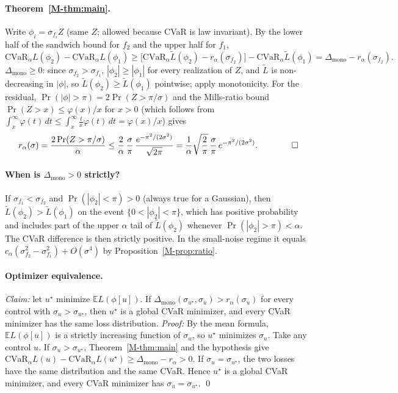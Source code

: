\documentclass[aps,pra,onecolumn,notitlepage,superscriptaddress,nofootinbib,floatfix]{revtex4-2}
\newcommand{\cvar}{\mathrm{CVaR}}
\newcommand{\E}{\mathbb{E}}
\newcommand{\Lt}{\widetilde L}
\begin{document}
\paragraph*{Theorem~\ref{M-thm:main}.} Write $\phi_i=\sigma_{f_i}Z$ (same $Z$;
allowed because CVaR is law invariant). By the lower half of
the sandwich bound for $f_2$ and the upper half for $f_1$,
\[
\cvar_\alpha L(\phi_2)-\cvar_\alpha L(\phi_1)\ge
\big[\cvar_\alpha\Lt(\phi_2)-r_\alpha(\sigma_{f_2})\big]-\cvar_\alpha\Lt(\phi_1)
=\Delta_{\mathrm{mono}}-r_\alpha(\sigma_{f_2}).
\]
$\Delta_{\mathrm{mono}}\ge0$: since $\sigma_{f_2}>\sigma_{f_1}$,
$|\phi_2|\ge|\phi_1|$ for every realization of $Z$, and $\Lt$ is
non-decreasing in $|\phi|$, so $\Lt(\phi_2)\ge\Lt(\phi_1)$ pointwise; apply
monotonicity. For the residual, $\Pr(|\phi|>\pi)=2\Pr(Z>\pi/\sigma)$ and the
Mills-ratio bound $\Pr(Z>x)\le\varphi(x)/x$ for $x>0$ (which follows from
$\int_x^\infty\varphi(t)\,dt\le\int_x^\infty\tfrac tx\varphi(t)\,dt=\varphi(x)/x$)
gives
\[
r_\alpha(\sigma)=\frac{2\Pr(Z>\pi/\sigma)}{\alpha}\le\frac{2}{\alpha}\,\frac{\sigma}{\pi}\,\frac{e^{-\pi^2/(2\sigma^2)}}{\sqrt{2\pi}}
=\frac1\alpha\sqrt{\frac2\pi}\,\frac\sigma\pi\,e^{-\pi^2/(2\sigma^2)} .\qquad\qed
\]

\paragraph*{When is $\Delta_{\mathrm{mono}}>0$ strictly?} If $\sigma_{f_1}<\sigma_{f_2}$ and
$\Pr(|\phi_2|<\pi)>0$ (always true for a Gaussian), then
$\Lt(\phi_2)>\Lt(\phi_1)$ on the event $\{0<|\phi_2|<\pi\}$, which has
positive probability and includes part of the upper $\alpha$ tail of
$\Lt(\phi_2)$ whenever $\Pr(|\phi_2|>\pi)<\alpha$. The CVaR difference is then
strictly positive. In the small-noise regime it equals
$c_\alpha(\sigma_{f_2}^2-\sigma_{f_1}^2)+O(\sigma^4)$ by
Proposition~\ref{M-prop:ratio}.

\paragraph*{Optimizer equivalence.} \emph{Claim:} let $u^\star$ minimize $\E L(\phi[u])$. If $\Delta_{\mathrm{mono}}(\sigma_{u^\star},\sigma_u)>r_\alpha(\sigma_u)$ for every control with $\sigma_u>\sigma_{u^\star}$, then $u^\star$ is a global CVaR minimizer, and every CVaR minimizer has the same loss distribution. \emph{Proof:} By the mean formula, $\E L(\phi[u])$ is a
strictly increasing function of $\sigma_u$, so $u^\star$ minimizes $\sigma_u$.
Take any control $u$. If $\sigma_u>\sigma_{u^\star}$, Theorem~\ref{M-thm:main}
and the hypothesis give
$\cvar_\alpha L(u)-\cvar_\alpha L(u^\star)\ge\Delta_{\mathrm{mono}}-r_\alpha>0$.
If $\sigma_u=\sigma_{u^\star}$, the two losses have the same distribution and
the same CVaR. Hence $u^\star$ is a global CVaR minimizer, and every CVaR
minimizer has $\sigma_u=\sigma_{u^\star}$. \qed
\end{document}
